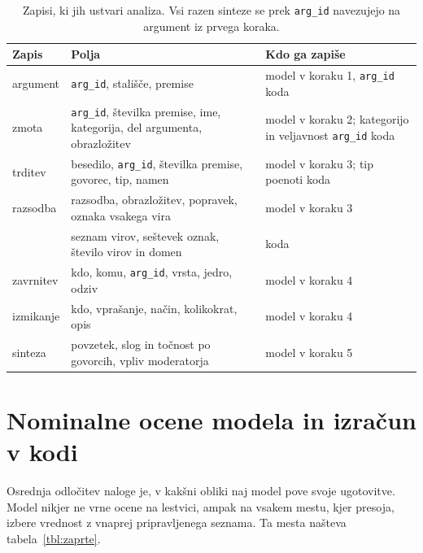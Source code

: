 \documentclass[a4paper, 12pt]{book}
\begin{document}
\begin{table}[H]
\centering\small{}
\begin{tabular}{@{}p{}p{}p{}@{}}
\toprule
Zapis & Polja & Kdo ga zapiše \\
\midrule
argument & \texttt{arg\_id}, stališče, premise &
model v koraku 1, \texttt{arg\_id} koda \\
\midrule
zmota & \texttt{arg\_id}, številka premise, ime, kategorija, del argumenta,
obrazložitev & model v koraku 2; kategorijo in veljavnost \texttt{arg\_id} koda \\
\midrule
trditev & besedilo, \texttt{arg\_id}, številka premise, govorec, tip, namen &
model v koraku 3; tip poenoti koda \\
\midrule
razsodba & razsodba, obrazložitev, popravek, oznaka vsakega vira &
model v koraku 3 \\
& seznam virov, seštevek oznak, število virov in domen & koda \\
\midrule
zavrnitev & kdo, komu, \texttt{arg\_id}, vrsta, jedro, odziv & model v koraku 4 \\
\midrule
izmikanje & kdo, vprašanje, način, kolikokrat, opis & model v koraku 4 \\
\midrule
sinteza & povzetek, slog in točnost po govorcih, vpliv moderatorja &
model v koraku 5 \\
\bottomrule
\end{tabular}
\caption{Zapisi, ki jih ustvari analiza. Vsi razen sinteze se prek
\texttt{arg\_id} navezujejo na argument iz prvega koraka.}
\label{tbl:podatkovni-model}
\end{table}


\section{Nominalne ocene modela in izračun v kodi}
\label{sec:kategorije-vs-stevilke}

Osrednja odločitev naloge je, v kakšni obliki naj model pove svoje ugotovitve. Model nikjer ne vrne ocene na lestvici, ampak na vsakem mestu, kjer presoja, izbere vrednost z vnaprej pripravljenega seznama. Ta mesta našteva tabela~\ref{tbl:zaprte}.
\end{document}
